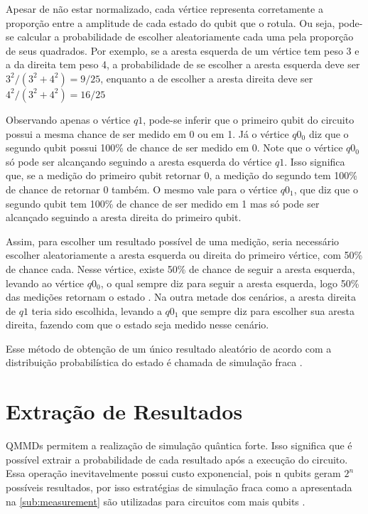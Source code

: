 Apesar de não estar normalizado, cada vértice representa corretamente a proporção entre a amplitude de cada estado do qubit que o rotula. Ou seja, pode-se calcular a probabilidade de escolher aleatoriamente cada uma pela proporção de seus quadrados. Por exemplo, se a aresta esquerda de um vértice tem peso 3 e a da direita tem peso 4, a probabilidade de se escolher a aresta esquerda deve ser $3^2/(3^2+4^2)=9/25$, enquanto a de escolher a aresta direita deve ser $4^2/(3^2+4^2)=16/25$

Observando apenas o vértice $q1$, pode-se inferir que o primeiro qubit do circuito possui a mesma chance de ser medido em 0 ou em 1. Já o vértice $q0_0$ diz que o segundo qubit possui 100\% de chance de ser medido em 0. Note que o vértice $q0_0$ só pode ser alcançando seguindo a aresta esquerda do vértice $q1$. Isso significa que, se a medição do primeiro qubit retornar 0, a medição do segundo tem 100\% de chance de retornar 0 também. O mesmo vale para o vértice $q0_1$, que diz que o segundo qubit tem 100\% de chance de ser medido em 1 mas só pode ser alcançado seguindo a aresta direita do primeiro qubit.

Assim, para escolher um resultado possível de uma medição, seria necessário escolher aleatoriamente a aresta esquerda ou direita do primeiro vértice, com 50\% de chance cada. Nesse vértice, existe 50\% de chance de seguir a aresta esquerda, levando ao vértice $q0_0$, o qual sempre diz para seguir a aresta esquerda, logo 50\% das medições retornam o estado . Na outra metade dos cenários, a aresta direita de $q1$ teria sido escolhida, levando a $q0_1$ que sempre diz para escolher sua aresta direita, fazendo com que o estado  seja medido nesse cenário.

Esse método de obtenção de um único resultado aleatório de acordo com a distribuição probabilística do estado é chamada de simulação fraca \cite{wang2015weak}.

\section{Extração de Resultados}\label{sec:result-extraction}

QMMDs permitem a realização de simulação quântica forte. Isso significa que é possível extrair a probabilidade de cada resultado após a execução do circuito. Essa operação inevitavelmente possui custo exponencial, pois n qubits geram $2^n$ possíveis resultados, por isso estratégias de simulação fraca como a apresentada na \cref{sub:measurement} são utilizadas para circuitos com mais qubits \cite{wang2015weak}.

